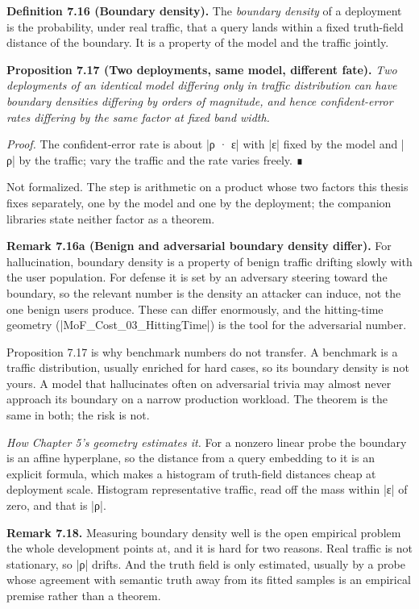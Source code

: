 \documentclass{memoir}
\begin{document}
\textbf{Definition 7.16 (Boundary density).} The \emph{boundary density} of a deployment is the
probability, under real traffic, that a query lands within a fixed truth-field
distance of the boundary. It is a property of the model and the traffic jointly.

\textbf{Proposition 7.17 (Two deployments, same model, different fate).} \emph{Two deployments of
an identical model differing only in traffic distribution can have boundary
densities differing by orders of magnitude, and hence confident-error rates
differing by the same factor at fixed band width.}

\emph{Proof.} The confident-error rate is about \LeanVerb|ρ · ε| with \LeanVerb|ε| fixed by the model and \LeanVerb|ρ|
by the traffic; vary the traffic and the rate varies freely. ∎

Not formalized. The step is arithmetic on a product whose two factors this
thesis fixes separately, one by the model and one by the deployment; the
companion libraries state neither factor as a theorem.

\textbf{Remark 7.16a (Benign and adversarial boundary density differ).} For hallucination,
boundary density is a property of benign traffic drifting slowly with the user
population. For defense it is set by an adversary steering toward the boundary,
so the relevant number is the density an attacker can induce, not the one benign
users produce. These can differ enormously, and the hitting-time geometry
(\LeanVerb|MoF_Cost_03_HittingTime|) is the tool for the adversarial number.

Proposition 7.17 is why benchmark numbers do not transfer. A benchmark is a
traffic distribution, usually enriched for hard cases, so its boundary density
is not yours. A model that hallucinates often on adversarial trivia may almost
never approach its boundary on a narrow production workload. The theorem is the
same in both; the risk is not.

\emph{How Chapter 5's geometry estimates it.} For a nonzero linear probe the boundary
is an affine hyperplane, so the distance from a query embedding to it is an
explicit formula, which makes a histogram of truth-field distances cheap at
deployment scale. Histogram representative traffic, read off the mass within \LeanVerb|ε|
of zero, and that is \LeanVerb|ρ|.

\textbf{Remark 7.18.} Measuring boundary density well is the open empirical problem the whole
development points at, and it is hard for two reasons. Real traffic is not
stationary, so \LeanVerb|ρ| drifts. And the truth field is only estimated, usually by a
probe whose agreement with semantic truth away from its fitted samples is an
empirical premise rather than a theorem.
\end{document}
